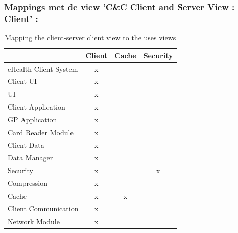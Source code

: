\documentclass[a4paper,10pt]{article}
\begin{document}
\subsubsection{Mappings met de view 'C\&C Client and Server View : Client' :}
\begin{table}[h!]
\begin{center}
 \begin{tabular}{l | c | c | c |} 
 & Client & Cache & Security\\ \hline
eHealth Client System & x & & \\ \hline
\hspace{6pt}Client UI & x & & \\ \hline
\hspace{12pt}UI & x & & \\ \hline
\hspace{6pt}Client Application & x & & \\ \hline
\hspace{12pt}GP Application & x & & \\ \hline
\hspace{12pt}Card Reader Module & x & & \\ \hline
\hspace{6pt}Client Data & x & & \\ \hline
\hspace{12pt}Data Manager & x & & \\ \hline
\hspace{12pt}Security & x & & x \\ \hline
\hspace{12pt}Compression & x & & \\ \hline
\hspace{12pt}Cache & x & x & \\ \hline
\hspace{6pt}Client Communication & x & & \\ \hline
\hspace{12pt}Network Module & x & & \\ \hline
\end{tabular}
\caption{Mapping the client-server client view to the uses views}
\end{center}
\end{table}

\clearpage
\end{document}
